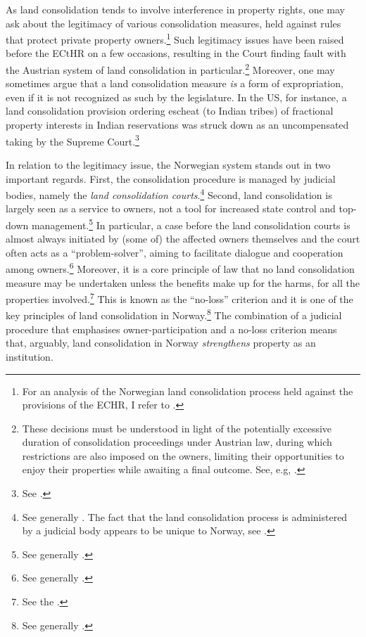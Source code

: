 As land consolidation tends to involve interference in property rights, one may ask about the legitimacy of various consolidation measures, held against rules that protect private property owners.\footnote{For an analysis of the Norwegian land consolidation process held against the provisions of the ECHR, I refer to \cite{utgard09}.} Such legitimacy issues have  been raised before the ECtHR on a few occasions, resulting in the Court finding fault with the Austrian system of land consolidation in particular.\footnote{These decisions must be understood in light of the potentially excessive duration of consolidation proceedings under Austrian law, during which restrictions are also imposed on the owners, limiting their opportunities to enjoy their properties while awaiting a final outcome. See, e.g, \cite{erkner87,poiss87}.} Moreover, one may sometimes argue that a land consolidation measure {\it is} a form of expropriation, even if it is not recognized as such by the legislature. In the US, for instance, a land consolidation provision ordering escheat (to Indian tribes) of fractional property interests in Indian reservations was struck down as an uncompensated taking by the Supreme Court.\footnote{See \cite{hodel87}.}


In relation to the legitimacy issue, the Norwegian system stands out in two important regards. First, the consolidation procedure is managed by judicial bodies, namely the {\it land consolidation courts}.\footnote{See generally \cite{langbach09}. The fact that the land consolidation process is administered by a judicial body appears to be unique to Norway, see \cite[45]{sky01}.} Second, land consolidation is largely seen as a service to owners, not a tool for increased state control and top-down management.\footnote{See generally \cite{sky09}.} In particular, a case before the land consolidation courts is almost always initiated by (some of) the affected owners themselves and the court often acts as a ``problem-solver'', aiming to facilitate dialogue and cooperation among owners.\footnote{See generally \cite{rognes98,rognes03,rognes07}.} Moreover, it is a core principle of law that no land consolidation measure may be undertaken unless the benefits make up for the harms, for all the properties involved.\footnote{See the \cite[3 a)]{lca79}.} This is known as the ``no-loss'' criterion and it is one of the key principles of land consolidation in Norway.\footnote{See generally \cite{rygg98}.} The combination of a judicial procedure that emphasises owner-participation and a no-loss criterion means that, arguably, land consolidation in Norway {\it strengthens} property as an institution.

